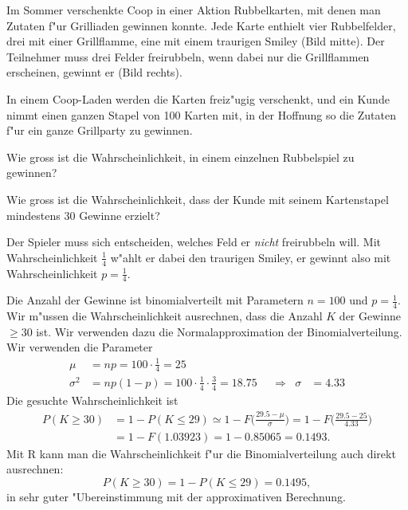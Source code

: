 Im Sommer verschenkte Coop in einer Aktion Rubbelkarten, mit denen
man Zutaten f"ur Grilliaden gewinnen konnte.
Jede Karte enthielt vier Rubbelfelder, drei mit einer Grillflamme,
eine mit einem traurigen Smiley (Bild mitte).
Der Teilnehmer muss drei Felder freirubbeln, wenn dabei nur die Grillflammen
erscheinen, gewinnt er (Bild rechts).
\begin{center}
\end{center}
In einem Coop-Laden werden die Karten freiz"ugig verschenkt, und ein Kunde
nimmt einen ganzen Stapel von 100 Karten mit, in der Hoffnung so die Zutaten
f"ur ein ganze Grillparty zu gewinnen.

\begin{teilaufgaben}
\item Wie gross ist die Wahrscheinlichkeit, in einem einzelnen Rubbelspiel zu
gewinnen?
\item Wie gross ist die Wahrscheinlichkeit, dass der Kunde mit seinem 
Kartenstapel mindestens  30 Gewinne erzielt?
\end{teilaufgaben}

\begin{loesung}
\begin{teilaufgaben}
\item
Der Spieler muss sich entscheiden, welches Feld er {\em nicht} freirubbeln will.
Mit Wahrscheinlichkeit $\frac14$ w"ahlt er dabei den traurigen Smiley,
er gewinnt also mit Wahrscheinlichkeit $p=\frac14$.
\item
Die Anzahl der Gewinne ist binomialverteilt mit Parametern $n=100$ und
$p=\frac14$.
Wir m"ussen die Wahrscheinlichkeit ausrechnen, dass die Anzahl $K$ der
Gewinne $\ge 30$ ist. 
Wir verwenden dazu die Normalapproximation der Binomialverteilung.
Wir verwenden die Parameter
\[
\begin{aligned}
\mu&=np = 100\cdot \frac14=25\\
\sigma^2&=np(1-p)=100\cdot\frac14\cdot\frac34=18.75&&\Rightarrow&\sigma&=4.33
\end{aligned}
\]
Die gesuchte Wahrscheinlichkeit ist
\begin{align*}
P(K\ge 30)
&=1-P(K \le 29)
\simeq
1-F\biggl(\frac{29.5-\mu}{\sigma}\biggr)
=
1-F\biggl(\frac{29.5-25}{4.33}\biggr)
\\
&=
1-F(1.03923)=1-0.85065=0.1493.
\end{align*}
Mit R kann man die Wahrscheinlichkeit f"ur die Binomialverteilung
auch direkt ausrechnen:
\[
P(K\ge 30)
=1-P(K\le 29)=0.1495,
\]
in sehr guter "Ubereinstimmung mit der approximativen Berechnung.
\end{teilaufgaben}
\end{loesung}
